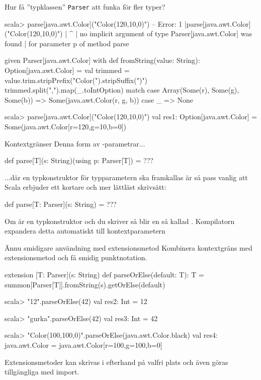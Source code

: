 \begin{Slide}{Hur få ''typklassen'' \texttt{Parser} att funka för fler typer?}
\begin{REPL}
scala> parse[java.awt.Color]("Color(120,10,0)")
-- Error:
1 |parse[java.awt.Color]("Color(120,10,0)")
  |                                        ^
  | no implicit argument of type Parser[java.awt.Color] was found 
  | for parameter p of method parse
\end{REPL}
\begin{Code}
given Parser[java.awt.Color] with
  def fromString(value: String): Option[java.awt.Color] =
    val trimmed = value.trim.stripPrefix("Color(").stripSuffix(")")
    trimmed.split(",").map(_.toIntOption) match
      case Array(Some(r), Some(g), Some(b)) => Some(java.awt.Color(r, g, b))
      case _ => None
\end{Code}
\begin{REPL}
scala> parse[java.awt.Color]("Color(120,10,0)")
val res1: Option[java.awt.Color] = Some(java.awt.Color[r=120,g=10,b=0])
\end{REPL}
\end{Slide}


\begin{Slide}{Kontextgränser}\SlideFontSmall
Denna form av -parametrar...
\begin{Code}
def parse[T](s: String)(using p: Parser[T]) = ???
\end{Code}
...där en typkonstruktor för typparametern ska framkallas är så pass vanlig att Scala erbjuder ett kortare och mer lättläst skrivsätt:
\begin{Code}
def parse[T: Parser](s: String) = ???
\end{Code}
Om  är en typkonstruktor och du skriver \code{[T: F]} så blir  en så kallad  . 
Kompilatorn expandera detta automatiskt till kontextparametern 
\end{Slide}



\begin{Slide}{Ännu smidigare användning med extensionsmetod}\SlideFontSmall
Kombinera kontextgräns med extensionsmetod och få smidig punktnotation.
\begin{Code}
extension [T: Parser](s: String) 
  def parseOrElse(default: T): T = 
    summon[Parser[T]].fromString(s).getOrElse(default)
 
\end{Code}
\begin{REPL}
scala> "12".parseOrElse(42)
val res2: Int = 12

scala> "gurka".parseOrElse(42)
val res3: Int = 42

scala> "Color(100,100,0)".parseOrElse(java.awt.Color.black)
val res4: java.awt.Color = java.awt.Color[r=100,g=100,b=0]
\end{REPL}
Extensionsmetoder kan skrivas i efterhand på valfri plats och även göras tillgängliga med import.
\end{Slide}







